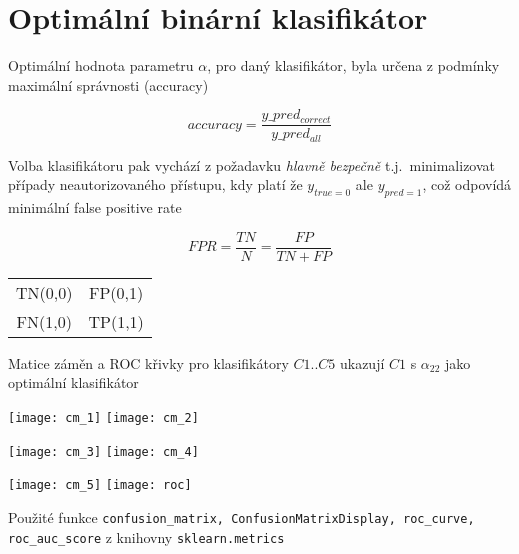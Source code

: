 \documentclass[11pt]{article}
\begin{document}
    \section{Optimální binární klasifikátor}\label{sec:opt_clf}
    Optimální hodnota parametru  $\alpha$, pro daný klasifikátor,
    byla určena z podmínky maximální správnosti (accuracy)

    \begin{equation}
        accuracy = \frac{y\_pred_{correct}}{y\_pred_{all}}\label{eq:accuracy}
    \end{equation}

    Volba klasifikátoru pak vychází z požadavku {\em hlavně bezpečně} t.j.\
    minimalizovat případy neautorizovaného přístupu, kdy platí že $y_{true = 0}$ ale $y_{pred = 1}$,
    což odpovídá minimální false positive rate

    \begin{equation}
        FPR = \frac{TN}{N}=\frac{FP}{TN + FP}\label{eq:fpr}
    \end{equation}

    \begin{center}
        \begin{tabular}{ c c }
            TN(0,0) & FP(0,1) \\
            FN(1,0) & TP(1,1) \\
        \end{tabular}
    \end{center}

    Matice záměn a ROC křivky pro klasifikátory $C1..C5$ ukazují $C1$ s $\alpha_{22}$ jako
    optimální klasifikátor

    \texttt{[image: cm\_1]}
    \texttt{[image: cm\_2]}

    \texttt{[image: cm\_3]}
    \texttt{[image: cm\_4]}

    \texttt{[image: cm\_5]}
    \texttt{[image: roc]}

    Použité funkce
    \texttt{confusion\_matrix, ConfusionMatrixDisplay, roc\_curve, roc\_auc\_score}
    z knihovny \texttt{sklearn.metrics}
\end{document}
